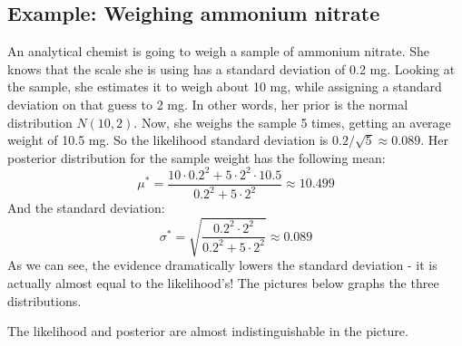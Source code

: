 \documentclass[12pt, a4paper]{article}
\begin{document}
\subsection{Example: Weighing ammonium nitrate}
An analytical chemist is going to weigh a sample of ammonium nitrate. She knows that the scale she is using has a standard deviation of 0.2 mg. Looking at the sample, she estimates it to weigh about 10 mg, while assigning a standard deviation on that guess to 2 mg. In other words, her prior is the normal distribution $N(10, 2)$. Now, she weighs the sample 5 times, getting an average weight of 10.5 mg. So the likelihood standard deviation is $0.2/\sqrt{5}\approx 0.089$. Her posterior distribution for the sample weight has the following mean:
\begin{equation}
\mu^*=\frac{10\cdot 0.2^2+5\cdot 2^2\cdot 10.5}{0.2^2+5\cdot 2^2}\approx 10.499
\end{equation}
And the standard deviation:
\begin{equation}
\sigma^*=\sqrt{\frac{0.2^2\cdot 2^2}{0.2^2+5\cdot 2^2}}\approx 0.089
\end{equation}
As we can see, the evidence dramatically lowers the standard deviation - it is actually almost equal to the likelihood's! The pictures below graphs the three distributions.


The likelihood and posterior are almost indistinguishable in the picture.
\end{document}
